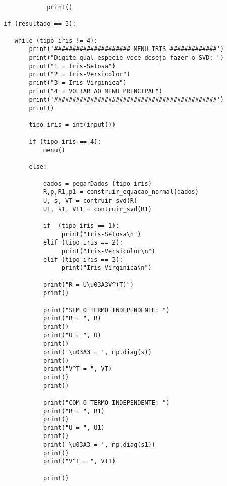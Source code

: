 \documentclass[a4paper,12pt,twoside]{article}
\begin{document}
\begin{lstlisting}
                    print()
        
        if (resultado == 3):
             
           while (tipo_iris != 4):
               print('##################### MENU IRIS #############')
               print("Digite qual especie voce deseja fazer o SVD: ")
               print("1 = Iris-Setosa")
               print("2 = Iris-Versicolor")
               print("3 = Iris Virginica")
               print("4 = VOLTAR AO MENU PRINCIPAL")
               print('#############################################')
               print()
             
               tipo_iris = int(input())
              
               if (tipo_iris == 4):
                   menu()
               
               else:
                
                   dados = pegarDados (tipo_iris)
                   R,p,R1,p1 = construir_equacao_normal(dados)
                   U, s, VT = contruir_svd(R)
                   U1, s1, VT1 = contruir_svd(R1)
                   
                   if  (tipo_iris == 1):
                        print("Iris-Setosa\n")
                   elif (tipo_iris == 2):
                        print("Iris-Versicolor\n")
                   elif (tipo_iris == 3):
                        print("Iris-Virginica\n")
                        
                   print("R = U\u03A3V^(T)")
                   print()
                   
                   print("SEM O TERMO INDEPENDENTE: ")
                   print("R = ", R)
                   print()
                   print("U = ", U)
                   print()
                   print('\u03A3 = ', np.diag(s))
                   print()
                   print("V^T = ", VT)
                   print()
                   print()
                    
                   print("COM O TERMO INDEPENDENTE: ")
                   print("R = ", R1)
                   print()
                   print("U = ", U1)
                   print()
                   print('\u03A3 = ', np.diag(s1))
                   print()
                   print("V^T = ", VT1)
                   
                   print()
                   
               
                

\end{lstlisting}
\end{document}
